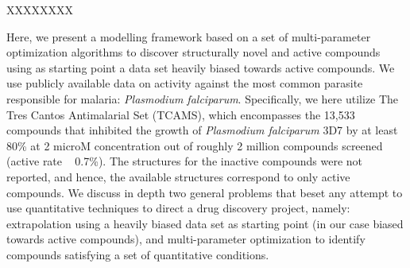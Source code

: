 \documentclass[journal=jacsat,manuscript=article]{achemso}
\begin{document}
XXXXXXXX\cite{Wallach2018}


Here, we present a modelling framework based on a set of multi-parameter optimization algorithms to discover structurally novel and active compounds 
using as starting point a data set heavily biased towards active compounds.
We use publicly available data on activity against the most common parasite responsible for malaria: \textit{Plasmodium falciparum}. 
Specifically, we here utilize The Tres Cantos Antimalarial Set (TCAMS), which encompasses the 13,533 compounds that inhibited the growth of \textit{Plasmodium falciparum} 3D7 by at least 80\% at 2 microM concentration out of roughly 2 million compounds screened (active rate ~ 0.7\%)\cite{Gamo2010}. The structures for the inactive compounds were not reported, and hence, the available structures correspond to only active compounds.
We discuss in depth two general problems that beset any attempt to use quantitative techniques to direct a drug discovery project, namely: extrapolation using a heavily biased data set as starting point (in our case biased towards active compounds), and multi-parameter optimization to identify compounds satisfying a set of quantitative conditions.
\newline
\newline
\end{document}
